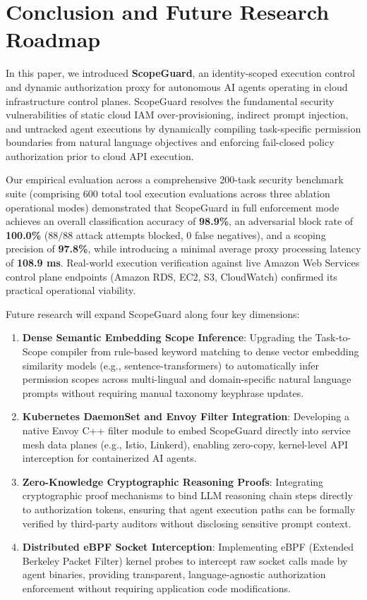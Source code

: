 \documentclass[conference]{IEEEtran}
\begin{document}
\section{Conclusion and Future Research Roadmap}\label{sec:conclusion}

In this paper, we introduced \textbf{ScopeGuard}, an identity-scoped execution control and dynamic authorization proxy for autonomous AI agents operating in cloud infrastructure control planes. ScopeGuard resolves the fundamental security vulnerabilities of static cloud IAM over-provisioning, indirect prompt injection, and untracked agent executions by dynamically compiling task-specific permission boundaries from natural language objectives and enforcing fail-closed policy authorization prior to cloud API execution.

Our empirical evaluation across a comprehensive 200-task security benchmark suite (comprising 600 total tool execution evaluations across three ablation operational modes) demonstrated that ScopeGuard in full enforcement mode achieves an overall classification accuracy of \textbf{98.9\%}, an adversarial block rate of \textbf{100.0\%} ($88/88$ attack attempts blocked, 0 false negatives), and a scoping precision of \textbf{97.8\%}, while introducing a minimal average proxy processing latency of \textbf{108.9 ms}. Real-world execution verification against live Amazon Web Services control plane endpoints (Amazon RDS, EC2, S3, CloudWatch) confirmed its practical operational viability.

Future research will expand ScopeGuard along four key dimensions:
\begin{enumerate}
    \item \textbf{Dense Semantic Embedding Scope Inference}: Upgrading the Task-to-Scope compiler from rule-based keyword matching to dense vector embedding similarity models (e.g., sentence-transformers) to automatically infer permission scopes across multi-lingual and domain-specific natural language prompts without requiring manual taxonomy keyphrase updates.
    \item \textbf{Kubernetes DaemonSet and Envoy Filter Integration}: Developing a native Envoy C++ filter module to embed ScopeGuard directly into service mesh data planes (e.g., Istio, Linkerd), enabling zero-copy, kernel-level API interception for containerized AI agents.
    \item \textbf{Zero-Knowledge Cryptographic Reasoning Proofs}: Integrating cryptographic proof mechanisms to bind LLM reasoning chain steps directly to authorization tokens, ensuring that agent execution paths can be formally verified by third-party auditors without disclosing sensitive prompt context.
    \item \textbf{Distributed eBPF Socket Interception}: Implementing eBPF (Extended Berkeley Packet Filter) kernel probes to intercept raw socket calls made by agent binaries, providing transparent, language-agnostic authorization enforcement without requiring application code modifications.
\end{enumerate}
\end{document}
